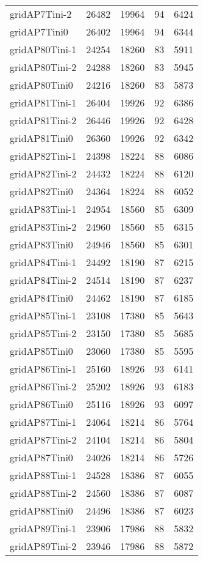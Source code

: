\begin{tabular}{lrrrr}
gridAP7Tini-2 & 26482 & 19964 & 94 & 6424 \\
gridAP7Tini0 & 26402 & 19964 & 94 & 6344 \\
gridAP80Tini-1 & 24254 & 18260 & 83 & 5911 \\
gridAP80Tini-2 & 24288 & 18260 & 83 & 5945 \\
gridAP80Tini0 & 24216 & 18260 & 83 & 5873 \\
gridAP81Tini-1 & 26404 & 19926 & 92 & 6386 \\
gridAP81Tini-2 & 26446 & 19926 & 92 & 6428 \\
gridAP81Tini0 & 26360 & 19926 & 92 & 6342 \\
gridAP82Tini-1 & 24398 & 18224 & 88 & 6086 \\
gridAP82Tini-2 & 24432 & 18224 & 88 & 6120 \\
gridAP82Tini0 & 24364 & 18224 & 88 & 6052 \\
gridAP83Tini-1 & 24954 & 18560 & 85 & 6309 \\
gridAP83Tini-2 & 24960 & 18560 & 85 & 6315 \\
gridAP83Tini0 & 24946 & 18560 & 85 & 6301 \\
gridAP84Tini-1 & 24492 & 18190 & 87 & 6215 \\
gridAP84Tini-2 & 24514 & 18190 & 87 & 6237 \\
gridAP84Tini0 & 24462 & 18190 & 87 & 6185 \\
gridAP85Tini-1 & 23108 & 17380 & 85 & 5643 \\
gridAP85Tini-2 & 23150 & 17380 & 85 & 5685 \\
gridAP85Tini0 & 23060 & 17380 & 85 & 5595 \\
gridAP86Tini-1 & 25160 & 18926 & 93 & 6141 \\
gridAP86Tini-2 & 25202 & 18926 & 93 & 6183 \\
gridAP86Tini0 & 25116 & 18926 & 93 & 6097 \\
gridAP87Tini-1 & 24064 & 18214 & 86 & 5764 \\
gridAP87Tini-2 & 24104 & 18214 & 86 & 5804 \\
gridAP87Tini0 & 24026 & 18214 & 86 & 5726 \\
gridAP88Tini-1 & 24528 & 18386 & 87 & 6055 \\
gridAP88Tini-2 & 24560 & 18386 & 87 & 6087 \\
gridAP88Tini0 & 24496 & 18386 & 87 & 6023 \\
gridAP89Tini-1 & 23906 & 17986 & 88 & 5832 \\
gridAP89Tini-2 & 23946 & 17986 & 88 & 5872 \\

\end{tabular}
